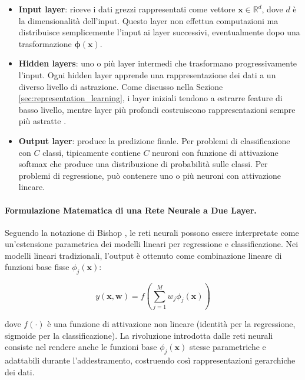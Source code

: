 \begin{itemize}
\item \textbf{Input layer}: riceve i dati grezzi rappresentati come vettore $\mathbf{x} \in \mathbb{R}^{d}$, dove $d$ è la dimensionalità dell'input. Questo layer non effettua computazioni ma distribuisce semplicemente l'input ai layer successivi, eventualmente dopo una trasformazione $\boldsymbol{\phi}(\mathbf{x})$.
\item \textbf{Hidden layers}: uno o più layer intermedi che trasformano progressivamente l'input. Ogni hidden layer apprende una rappresentazione dei dati a un diverso livello di astrazione. Come discusso nella Sezione \ref{sec:representation_learning}, i layer iniziali tendono a estrarre feature di basso livello, mentre layer più profondi costruiscono rappresentazioni sempre più astratte \cite{bengio2013representation}.
\item \textbf{Output layer}: produce la predizione finale. Per problemi di classificazione con $C$ classi, tipicamente contiene $C$ neuroni con funzione di attivazione softmax che produce una distribuzione di probabilità sulle classi. Per problemi di regressione, può contenere uno o più neuroni con attivazione lineare.
\end{itemize}



\paragraph{Formulazione Matematica di una Rete Neurale a Due Layer.} Seguendo la notazione di Bishop \cite{bishop2006pattern}, le reti neurali possono essere interpretate come un'estensione parametrica dei modelli lineari per regressione e classificazione. Nei modelli lineari tradizionali, l'output è ottenuto come combinazione lineare di funzioni base fisse $\phi_j(\mathbf{x})$:

\begin{equation}
y(\mathbf{x}, \mathbf{w}) = f\left(\sum_{j=1}^{M} w_j \phi_j(\mathbf{x})\right)
\label{eq:linear_model}
\end{equation}

dove $f(\cdot)$ è una funzione di attivazione non lineare (identità per la regressione, sigmoide per la classificazione). La rivoluzione introdotta dalle reti neurali consiste nel rendere anche le funzioni base $\phi_j(\mathbf{x})$ stesse parametriche e adattabili durante l'addestramento, costruendo così rappresentazioni gerarchiche dei dati.

